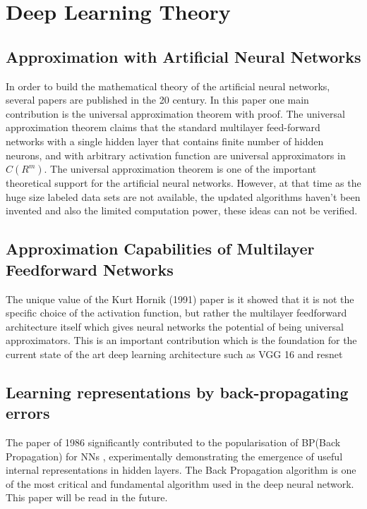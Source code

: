 \documentclass[a4paper,12pt]{article}
\begin{document}
\section{Deep Learning Theory}
\subsection{Approximation with Artificial Neural Networks \cite{csaji2001}}
In order to build the mathematical theory of the artificial neural networks, several papers are published in the 20 century. In this paper one main contribution is the universal approximation theorem with proof. The universal approximation theorem claims \cite{csaji2001}  that the standard multilayer feed-forward networks with a single hidden layer that contains finite number of hidden neurons, and with arbitrary activation function are universal approximators in $C(R^m)$.  The universal approximation theorem is one of the important theoretical support for the artificial neural networks. However, at that time as the huge size labeled data sets are not available, the updated algorithms haven't been invented and also the limited computation power, these ideas can not be verified.


\subsection{Approximation Capabilities of Multilayer Feedforward Networks \cite{hornik1991} }

The unique value of the Kurt Hornik (1991) \cite{hornik1991} paper is it showed that it is not the specific choice of the activation function, but rather the multilayer feedforward architecture itself which gives neural networks the potential of being universal approximators. This is an important contribution which is the foundation for the current state of the art deep learning architecture such as VGG 16  \cite{SimonyanZ14a} and resnet \cite{DBLP:journals/corr/HeZRS15}




\subsection{Learning representations by back-propagating errors\cite{Rumelhart1986}}
The paper of 1986 significantly contributed to the popularisation of BP(Back Propagation) for NNs \cite{Rumelhart1986}, experimentally demonstrating the emergence of useful internal representations in hidden layers. The Back Propagation algorithm is one of the most critical and fundamental algorithm used in the deep neural network.
This paper will be read in the future.\\
\end{document}
